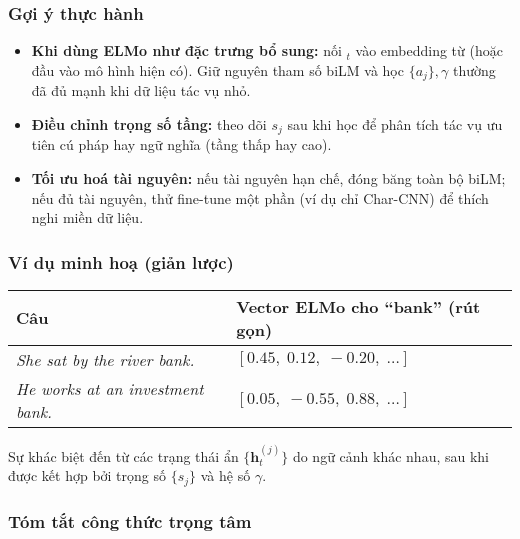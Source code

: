 \subsubsection{Gợi ý thực hành}
\label{ssec:elmo_practice}

\begin{itemize}
  \item \textbf{Khi dùng ELMo như đặc trưng bổ sung:} nối $_t$ vào embedding từ (hoặc đầu vào mô hình hiện có). Giữ nguyên tham số biLM và học $\{a_j\},\gamma$ thường đã đủ mạnh khi dữ liệu tác vụ nhỏ.
  \item \textbf{Điều chỉnh trọng số tầng:} theo dõi $s_j$ sau khi học để phân tích tác vụ ưu tiên cú pháp hay ngữ nghĩa (tầng thấp hay cao).
  \item \textbf{Tối ưu hoá tài nguyên:} nếu tài nguyên hạn chế, đóng băng toàn bộ biLM; nếu đủ tài nguyên, thử fine-tune một phần (ví dụ chỉ Char-CNN) để thích nghi miền dữ liệu.
\end{itemize}

\subsubsection{Ví dụ minh hoạ (giản lược)}
\label{ssec:elmo_example}

\begin{center}
\begin{tabular}{p{} p{}}
\toprule
\textbf{Câu} & \textbf{Vector ELMo cho ``bank'' (rút gọn)} \\
\midrule
\emph{She sat by the river bank.} & $[0.45,\; 0.12,\; -0.20,\; \dots]$ \\
\emph{He works at an investment bank.} & $[0.05,\; -0.55,\; 0.88,\; \dots]$ \\
\bottomrule
\end{tabular}
\end{center}

Sự khác biệt đến từ các trạng thái ẩn $\{\mathbf{h}_t^{(j)}\}$ do ngữ cảnh khác nhau, sau khi được kết hợp bởi trọng số $\{s_j\}$ và hệ số $\gamma$.

\subsubsection{Tóm tắt công thức trọng tâm}
\label{ssec:elmo_key_equations}

